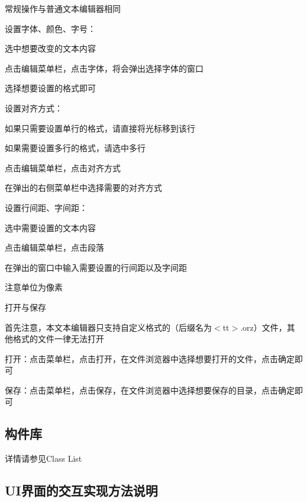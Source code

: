 \begin{DoxyEnumerate}
\item 常规操作与普通文本编辑器相同
\item 设置字体、颜色、字号：
\begin{DoxyItemize}
\item 选中想要改变的文本内容
\item 点击编辑菜单栏，点击字体，将会弹出选择字体的窗口
\item 选择想要设置的格式即可
\end{DoxyItemize}
\item 设置对齐方式：
\begin{DoxyItemize}
\item 如果只需要设置单行的格式，请直接将光标移到该行
\item 如果需要设置多行的格式，请选中多行
\item 点击编辑菜单栏，点击对齐方式
\item 在弹出的右侧菜单栏中选择需要的对齐方式
\end{DoxyItemize}
\item 设置行间距、字间距：
\begin{DoxyItemize}
\item 选中需要设置的文本内容
\item 点击编辑菜单栏，点击段落
\item 在弹出的窗口中输入需要设置的行间距以及字间距
\item 注意单位为像素
\end{DoxyItemize}
\item 打开与保存
\begin{DoxyItemize}
\item 首先注意，本文本编辑器只支持自定义格式的（后缀名为$<$tt$>$.\+orz）文件，其他格式的文件一律无法打开
\item 打开：点击菜单栏，点击打开，在文件浏览器中选择想要打开的文件，点击确定即可
\item 保存：点击菜单栏，点击保存，在文件浏览器中选择想要保存的目录，点击确定即可
\end{DoxyItemize}
\end{DoxyEnumerate}

\subsection*{构件库 }

详情请参见\+Class List

\subsection*{U\+I界面的交互实现方法说明 }


